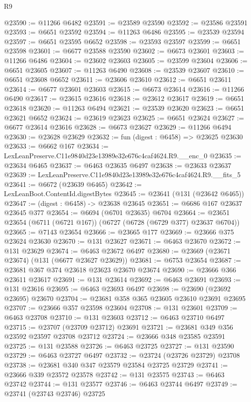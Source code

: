 \begin{lexlean}{R9}
\begin{coremodule}
@23590 := @11266 @6482
@23591 := @23589 @23590
@23592 := @23586 @23591
@23593 := @6651 @23592
@23594 := @11263 @6486
@23595 := @23539 @23594
@23597 := @6651 @23595 @6652
@23598 := @23593 @23597
@23599 := @6651 @23598
@23601 := @6677 @23588 @23590
@23602 := @6673 @23601
@23603 := @11266 @6486
@23604 := @23602 @23603
@23605 := @23599 @23604
@23606 := @6651 @23605
@23607 := @11263 @6490
@23608 := @23539 @23607
@23610 := @6651 @23608 @6652
@23611 := @23606 @23610
@23612 := @6651 @23611
@23614 := @6677 @23601 @23603
@23615 := @6673 @23614
@23616 := @11266 @6490
@23617 := @23615 @23616
@23618 := @23612 @23617
@23619 := @6651 @23618
@23620 := @11263 @6494
@23621 := @23539 @23620
@23623 := @6651 @23621 @6652
@23624 := @23619 @23623
@23625 := @6651 @23624
@23627 := @6677 @23614 @23616
@23628 := @6673 @23627
@23629 := @11266 @6494
@23630 := @23628 @23629
@23632 := fun (digest : @6458) => @23625 @23630
@23633 := @6662 @167
@23634 := LexLeanPreserve.C11e9840d23e13989e32e676c4caf4624.R9.__enc_0
@23635 := @23634 @6465
@23637 := @6463 @23635 @6497
@23638 := @23633 @23637
@23639 := LexLeanPreserve.C11e9840d23e13989e32e676c4caf4624.R9.__fits_5
@23641 := @6672 (@23639 @6465)
@23642 := LexLeanBoot.ContentId.digestBytes
@23645 := @23641 (@131 (@23642 @6465))
@23647 := (digest : @6458) -> @23638 @23645
@23651 := @6686 @167 @23637 @23645 @377
@23654 := @6694 (@6701 @23635) @6704
@23664 := @23651 @23654 (@6711 (@6721 @167)) (@6727 (@6728 (@6729 @377) @23637 @6704))
@23665 := @7143 @23654
@23666 := @23665 @177
@23669 := @23666 @375 @23624 @23630
@23670 := @131 @23627
@23671 := @6463 @23670
@23672 := @131 @23629
@23674 := @6463 @23672 @6497
@23680 := @23669 (@23671 @23674) (@131 (@6677 @23627 @23629))
@23681 := @6753 @23654
@23687 := @23681 @367 @374 @23618 @23623 @23670 @23674
@23690 := @23666 @366 @23611 @23617
@23691 := @131 @23614
@23692 := @6463 @23691
@23693 := @131 @23616
@23695 := @6463 @23693 @6497
@23698 := @23690 (@23692 @23695) @23670
@23704 := @23681 @358 @365 @23605 @23610 @23691 @23695
@23707 := @23666 @357 @23598 @23604
@23708 := @131 @23601
@23709 := @6463 @23708
@23710 := @131 @23603
@23712 := @6463 @23710 @6497
@23715 := @23707 (@23709 @23712) @23691
@23721 := @23681 @349 @356 @23592 @23597 @23708 @23712
@23724 := @23666 @348 @23585 @23591
@23725 := @131 @23588
@23726 := @6463 @23725
@23727 := @131 @23590
@23729 := @6463 @23727 @6497
@23732 := @23724 (@23726 @23729) @23708
@23738 := @23681 @340 @347 @23579 @23584 @23725 @23729
@23741 := @23666 @339 @23572 @23578
@23742 := @131 @23575
@23743 := @6463 @23742
@23744 := @131 @23577
@23746 := @6463 @23744 @6497
@23749 := @23741 (@23743 @23746) @23725

\end{coremodule}
\end{lexlean}
